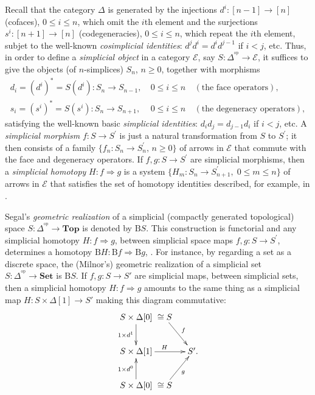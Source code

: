 \documentclass[]{amsart}
\begin{document}
Recall that the category $\Delta$ is generated by the injections $d^i:[n-1]\to[n]$ (cofaces),
$0\leq i\leq n$, which omit  the $i$th element and the surjections $s^i:[n+1]\to [n]$
(codegeneracies), $0\leq i\leq n$, which repeat the $i$th element, subjet to the well-known  {\em
cosimplicial identities}: $d^j d^i=d^i d^{j-1}$ if $i<j$, etc. Thus, in order to define a {\em
simplicial object} in a category $\mathcal{E}$, say $S:\Delta^{\!{^\mathrm{op}}}\to  \mathcal{E}$,
it suffices to give the objects (of $n$-simplices) $S_n$, $n\geq 0$, together with morphisms
$$
\begin{array}{lll}d_i=(d^i)^*=S(d^i):S_n\to S_{n-1},&\ 0\leq i\leq n& \ (\mbox{the face operators}),\\[3pt]
s_i=(s^i)^*=S(s^i):S_n\to S_{n+1},&\ 0\leq i\leq n& \ (\mbox{the degeneracy operators}),
\end{array}
$$
satisfying the well-known basic {\em simplicial identities}: $d_id_j=d_{j-1}d_i$ if $i<j$, etc. A
{\em simplicial morphism} $f:S\rightarrow S^\prime$ is just a natural transformation from $S$ to
$S^\prime$; it then consists of a family $\{f_n:S_n\rightarrow S^\prime_{n},\, n\geq 0\}$ of arrows
in $\mathcal{E}$ that commute with the face and degeneracy operators. If $f,g:S\rightarrow
S^\prime$ are simplicial morphisms, then a \emph{simplicial homotopy} $H:f\Rightarrow g$ is  a
system $\{H_m:S_n\rightarrow S_{n+1}^\prime,\; 0\leq m\leq n\}$ of arrows in $\mathcal{E}$ that
satisfies the set of homotopy identities described, for example, in \cite[Definition 5.1]{may67}.

Segal's {\em geometric realization} \cite{segal} of a simplicial (compactly generated topological)
space $S:\Delta^{\!{^\mathrm{op}}}\to  \mathbf{Top}$ is denoted by ${\ensuremath{\mathrm{B}}} S$. This construction is
functorial and any simplicial homotopy $H:f\Rightarrow g$, between simplicial space maps
$f,g:S\rightarrow S^\prime$, determines a homotopy ${\ensuremath{\mathrm{B}}} H:{\ensuremath{\mathrm{B}}} f \Rightarrow {\ensuremath{\mathrm{B}}} g$,
\cite[Corollary 11.10]{may72}. For instance, by regarding a set as a discrete space, the (Milnor's)
geometric realization of a simplicial set $S:\Delta^{\!{^\mathrm{op}}}\to {\ensuremath{\mathbf{Set}}}$ is ${\ensuremath{\mathrm{B}}} S$. If
$f,g:S\to S'$ are simplicial maps, between simplicial sets,  then a simplicial homotopy
$H:f\Rightarrow g$ amounts to the same thing \cite[Proposition 6.2]{may67} as a simplicial map $H:
S\times \Delta[1]\to S'$ making this diagram commutative:
$$
\xymatrix@C=0pt{S\times\Delta[0]\ar[d]_{1\times d^1}&\cong S \ar[rrrd]^{f}&\\ S\times\Delta[1] \ar[rrrr]^H&&&&S'.\\
S\times\Delta[0]\ar[u]^{1\times d^0}&\cong S \ar[urrr]_{g}& }
$$
\end{document}

